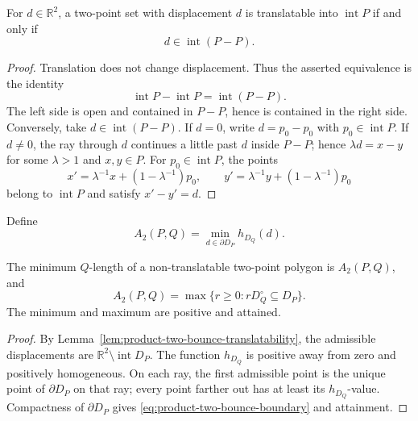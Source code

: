 \begin{unverified}
\begin{lemma}
\label{lem:product-two-bounce-translatability}
For \(d\in\mathbb R^2\), a two-point set with displacement \(d\) is
translatable into \(\operatorname{int}P\) if and only if
\[
 d\in\operatorname{int}(P-P).
\]
\end{lemma}

\begin{proof}
Translation does not change displacement.  Thus the asserted equivalence is
the identity
\[
 \operatorname{int}P-\operatorname{int}P
 =\operatorname{int}(P-P).
\]
The left side is open and contained in \(P-P\), hence is contained in the
right side.  Conversely, take \(d\in\operatorname{int}(P-P)\).  If \(d=0\),
write \(d=p_0-p_0\) with \(p_0\in\operatorname{int}P\).  If \(d\neq0\),
the ray through \(d\) continues a little past \(d\) inside \(P-P\); hence
\(\lambda d=x-y\) for some \(\lambda>1\) and \(x,y\in P\).  For
\(p_0\in\operatorname{int}P\), the points
\[
 x'=\lambda^{-1}x+(1-\lambda^{-1})p_0,\qquad
 y'=\lambda^{-1}y+(1-\lambda^{-1})p_0
\]
belong to \(\operatorname{int}P\) and satisfy \(x'-y'=d\).
\end{proof}

\begin{definition}
\label{def:product-two-bounce-a2}
Define
\begin{equation}
\label{eq:product-two-bounce-boundary}
 A_2(P,Q)=\min_{d\in\partial D_P}h_{D_Q}(d).
\end{equation}
\end{definition}

\begin{lemma}
\label{lem:product-two-bounce-containment}
The minimum \(Q\)-length of a non-translatable two-point polygon is
\(A_2(P,Q)\), and
\begin{equation}
\label{eq:product-two-bounce-containment}
 A_2(P,Q)
 =\max\{r\geq0:rD_Q^\circ\subseteq D_P\}.
\end{equation}
The minimum and maximum are positive and attained.
\end{lemma}

\begin{proof}
By Lemma~\ref{lem:product-two-bounce-translatability}, the admissible
displacements are \(\mathbb R^2\setminus\operatorname{int}D_P\).
The function \(h_{D_Q}\) is positive away from zero and positively
homogeneous.  On each ray, the first admissible point is the unique point of
\(\partial D_P\) on that ray; every point farther out has at least its
\(h_{D_Q}\)-value.  Compactness of \(\partial D_P\) gives
\eqref{eq:product-two-bounce-boundary} and attainment.


\end{proof}
\end{unverified}

